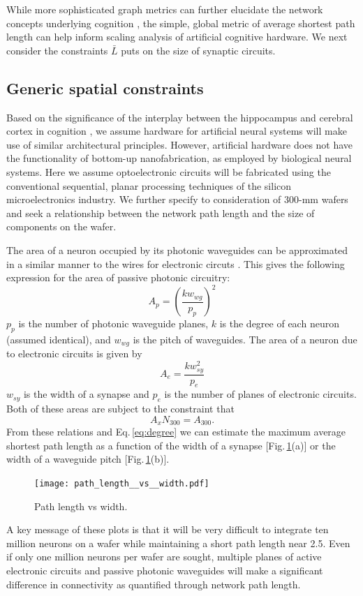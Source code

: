 \documentclass[twocolumn]{article}
\begin{document}
While more sophisticated graph metrics can further elucidate the network concepts underlying cognition \cite{busp2009,sp2010}, the simple, global metric of average shortest path length can help inform scaling analysis of artificial cognitive hardware. We next consider the constraints $\bar{L}$ puts on the size of synaptic circuits.

\subsection{Generic spatial constraints}
\label{sec:spatial_constraints}
Based on the significance of the interplay between the hippocampus and cerebral cortex in cognition \cite{frbu2016}, we assume hardware for artificial neural systems will make use of similar architectural principles. However, artificial hardware does not have the functionality of bottom-up nanofabrication, as employed by biological neural systems. Here we assume optoelectronic circuits will be fabricated using the conventional sequential, planar processing techniques of the silicon microelectronics industry. We further specify to consideration of 300-mm wafers and seek a relationship between the network path length and the size of components on the wafer.

The area of a neuron occupied by its photonic waveguides can be approximated in a similar manner to the wires for electronic circuts \cite{ke1982}. This gives the following expression for the area of passive photonic circuitry:
\begin{equation}
\label{eq:area_p}
A_p = \left( \frac{k w_{wg}}{p_p} \right)^2
\end{equation}
$p_p$ is the number of photonic waveguide planes, $k$ is the degree of each neuron (assumed identical), and $w_{wg}$ is the pitch of waveguides. The area of a neuron due to electronic circuits is given by
\begin{equation}
\label{eq:area_e}
A_e = \frac{k w_{sy}^2}{p_e}
\end{equation}
$w_{sy}$ is the width of a synapse and $p_e$ is the number of planes of electronic circuits. Both of these areas are subject to the constraint that
\begin{equation}
\label{eq:area_x}
A_x N_{300} = A_{300}.
\end{equation}
From these relations and Eq.\,\ref{eq:degree} we can estimate the maximum average shortest path length as a function of the width of a synapse [Fig.\,\ref{fig:path_length__vs__width}(a)] or the width of a waveguide pitch [Fig.\,\ref{fig:path_length__vs__width}(b)]. 
\begin{figure}
    \centering
    \texttt{[image: path\_length\_\_vs\_\_width.pdf]}
    \caption{Path length vs width.}
    \label{fig:path_length__vs__width}
\end{figure}
A key message of these plots is that it will be very difficult to integrate ten million neurons on a wafer while maintaining a short path length near 2.5. Even if only one million neurons per wafer are sought, multiple planes of active electronic circuits and passive photonic waveguides will make a significant difference in connectivity as quantified through network path length.
\end{document}
